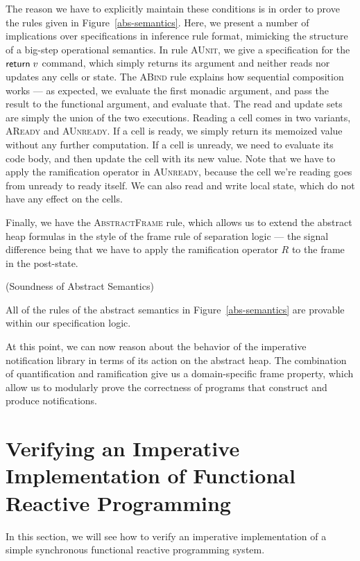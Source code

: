 The reason we have to explicitly maintain these conditions is in order
to prove the rules given in Figure~\ref{abs-semantics}. Here, we
present a number of implications over specifications in inference rule
format, mimicking the structure of a big-step operational semantics. 
In rule \textsc{AUnit}, we give a specification for the $\mathsf{return}\; v$ command, 
which simply returns its argument and neither reads nor updates any 
cells or state. The \textsc{ABind} rule explains how sequential composition 
works --- as expected, we evaluate the first monadic argument, and pass
the result to the functional argument, and evaluate that. The read and
update sets are simply the union of the two executions. Reading a cell
comes in two variants, \textsc{AReady} and \textsc{AUnready}. If a cell is ready, we
simply return its memoized value without any further computation. If
a cell is unready, we need to evaluate its code body, and then update
the cell with its new value. Note that we have to apply the ramification
operator in \textsc{AUnready}, because the cell we're reading goes from unready
to ready itself. We can also read and write local state, which do not have any
effect on the cells. 

Finally, we have the \textsc{AbstractFrame} rule, which allows us to
extend the abstract heap formulas in the style of the frame rule of 
separation logic --- the signal difference being that we have to apply 
the ramification operator $R$ to the frame in the post-state. 

\begin{prop}{(Soundness of Abstract Semantics)}

All of the rules of the abstract semantics in Figure~\ref{abs-semantics} are
provable within our specification logic. 
\end{prop}

At this point, we can now reason about the behavior of the imperative
notification library in terms of its action on the abstract heap. The
combination of quantification and ramification give us a domain-specific 
frame property, which allow us to modularly prove the correctness of programs 
that construct and produce notifications.

\section{Verifying an Imperative Implementation of Functional Reactive Programming}

In this section, we will see how to verify an imperative
implementation of a simple synchronous functional reactive programming
system.

